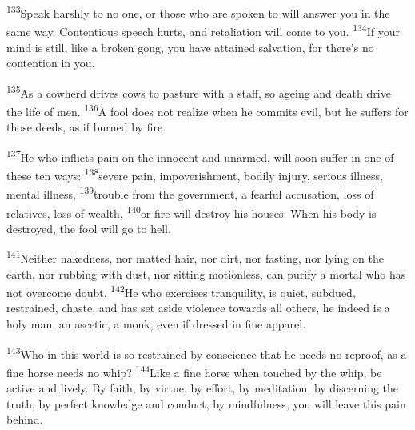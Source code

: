 \documentclass[openany,12pt,english]{book}
\newenvironment{para}{\par\pretolerance=100\tolerance=200\setlength{\emergencystretch}{0.6em}\relax}{\par}
\begin{document}
\begin{para}
    \textsuperscript{133}\thinspace{}Speak harsh\-ly to no one, or those who are spo\-ken to will an\-swer you in the same way. Con\-ten\-tious speech hurts, and re\-tal\-i\-a\-tion will come to you.
    \textsuperscript{134}\thinspace{}If your mind is still, like a bro\-ken gong, you have attained sal\-va\-tion, for there's no con\-ten\-tion in you.
\end{para}

\begin{para}
    \textsuperscript{135}\thinspace{}As a cow\-herd drives cows to pas\-ture with a staff, so age\-ing and death drive the life of men.
    \textsuperscript{136}\thinspace{}A fool does not re\-al\-ize when he commits evil, but he suffers for those deeds, as if burned by fire.
\end{para}

\begin{para}
    \textsuperscript{137}\thinspace{}He who inflicts pain on the in\-no\-cent and un\-armed, will soon suf\-fer in one of these ten ways:
    \textsuperscript{138}\thinspace{}se\-vere pain, im\-pov\-er\-ish\-ment, bod\-i\-ly in\-ju\-ry, se\-ri\-ous ill\-ness, men\-tal ill\-ness,
    \textsuperscript{139}\thinspace{}trou\-ble from the gov\-ern\-ment, a fear\-ful ac\-cu\-sa\-tion, loss of relatives, loss of wealth,
    \textsuperscript{140}\thinspace{}or fire will de\-stroy his hous\-es. When his bod\-y is destroyed, the fool will go to hell.
\end{para}

\begin{para}
    \textsuperscript{141}\thinspace{}Nei\-ther na\-ked\-ness, nor mat\-ted hair, nor dirt, nor fasting, nor ly\-ing on the earth, nor rub\-bing with dust, nor sit\-ting mo\-tion\-less, can pu\-ri\-fy a mor\-tal who has not o\-ver\-come doubt.
    \textsuperscript{142}\thinspace{}He who exercises tran\-quil\-i\-ty, is qui\-et, sub\-dued, restrained, chaste, and has set a\-side vi\-o\-lence to\-wards all others, he in\-deed is a ho\-ly man, an as\-cet\-ic, a monk, e\-ven if dressed in fi\-ne ap\-par\-el.
\end{para}

\begin{para}
    \textsuperscript{143}\thinspace{}Who in this world is so restrained by con\-science that he needs no re\-proof, as a fi\-ne horse needs no whip?
    \textsuperscript{144}\thinspace{}Like a fi\-ne horse when touched by the whip, be ac\-tive and live\-ly. By faith, by vir\-tue, by ef\-fort, by med\-i\-ta\-tion, by dis\-cern\-ing the truth, by per\-fect knowl\-edge and con\-duct, by mind\-ful\-ness, you will leave this pain be\-hind.
\end{para}
\end{document}
